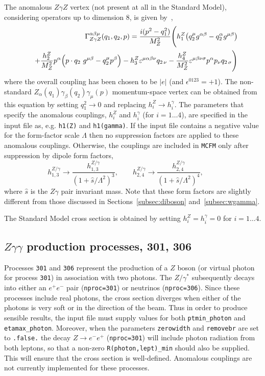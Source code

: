 \documentclass[12pt]{article}
\begin{document}
The anomalous $Z\gamma Z$ vertex (not present at all in the Standard Model),
considering operators up to dimension 8, is given by~\cite{DeFlorian:2000sg},
\begin{eqnarray}
 && \Gamma^{\alpha \beta \mu}_{Z \gamma Z}(q_1, q_2, p) = 
   \frac{i(p^2-q_1^2)}{M_Z^2} \Biggl( 
   h_1^Z \bigl( q_2^\mu g^{\alpha\beta} - q_2^\alpha g^{\mu \beta}
   \bigr)
    \nonumber \\ && + \frac{h_2^Z}{M_Z^2} p^\alpha \Bigl( p\cdot q_2\ g^{\mu\beta} -
            q_2^\mu p^\beta \Bigr)
   - h_3^Z \varepsilon^{\mu\alpha\beta\nu} q_{2\, \nu} 
   - \frac{h_4^Z}{M_Z^2} \varepsilon^{\mu\beta\nu\sigma} p^\alpha
p_\nu q_{2\, \sigma} \Biggl)
\end{eqnarray}
where the overall coupling has been chosen to be $|e|$ (and
$\epsilon^{0123}=+1$). The non-standard $Z_\alpha(q_1) \gamma_\beta(q_2)
\gamma_\mu(p)$ momentum-space vertex can be obtained from
this equation by setting $q_1^2 \to 0$ and replacing $h_i^Z \to
h_i^\gamma$. 
The parameters that
specify the anomalous couplings, $h_i^Z$ and $h_i^\gamma$ (for $i=1\ldots 4$), are
specified in the input file as, e.g. {\tt h1(Z)} and {\tt h1(gamma)}.
If the input file contains a negative value for the form-factor scale $\Lambda$
then no suppression factors are applied to these anomalous couplings.
Otherwise, the couplings are included
in {\tt MCFM} only after suppression by dipole form factors,
\begin{displaymath}
h_{1,3}^{Z/\gamma} \rightarrow
 \frac{h_{1,3}^{Z/\gamma}}{(1+\hat{s}/\Lambda^2)^3}, \qquad
h_{2,4}^{Z/\gamma} \rightarrow
 \frac{h_{2,4}^{Z/\gamma}}{(1+\hat{s}/\Lambda^2)^4}, \qquad
\end{displaymath}
where $\hat{s}$ is the $Z\gamma$ pair invariant mass. Note that these form factors are slightly
different from those discussed in Sections~\ref{subsec:diboson} and~\ref{subsec:wgamma}.

The Standard Model cross section is obtained by setting $h_i^Z = h_i^\gamma = 0$ for $i=1\ldots 4$.

\subsection{$Z\gamma\gamma$ production processes, 301, 306} 

Processes {\tt{301}} and {\tt{306}} represent the production of a $Z$ boson 
(or virtual photon for process {\tt 301}) in association with two photons.   The $Z/\gamma^*$ subsequently decays into 
either an $e^+ e^-$ pair ({\tt nproc=301}) or neutrinos ({\tt nproc=306}).
Since these processes include real photons, the cross section diverges
when either of the photons is very soft or in the direction of the beam.
Thus in order to produce sensible results, the input file must supply values for both
{\tt ptmin\_photon} and {\tt etamax\_photon}. Moreover, when the parameters {\tt zerowidth}
and {\tt removebr} are set to {\tt .false.} the decay $Z \to e^- e^+$ ({\tt nproc=301})
will include photon radiation from both leptons, so that a non-zero {\tt R(photon,lept)\_min}
should also be supplied. This will ensure that the cross section is well-defined.
Anomalous couplings are not currently implemented for these processes. 
\end{document}
